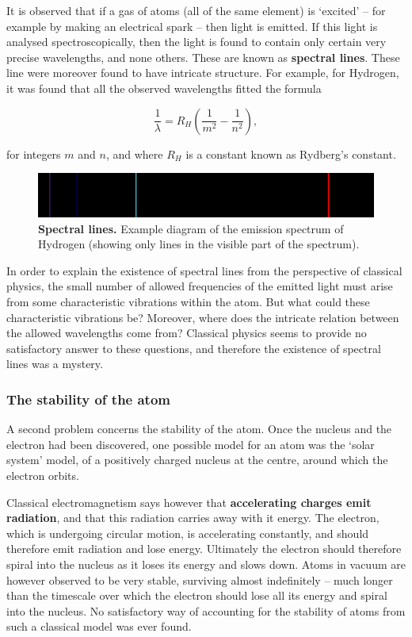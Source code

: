 \documentclass[9pt,Preprint]{lapreprint}
\begin{document}
It is observed that if a gas of atoms (all of the same element) is `excited' -- for example by making an electrical spark -- then light is emitted. If this light is analysed spectroscopically, then the light is found to contain only certain very precise wavelengths, and none others. These are known as \textbf{spectral lines}. These line were moreover found to have intricate structure. For example, for Hydrogen, it was found that all the observed wavelengths fitted the formula

\begin{equation}
\frac{1}{\lambda} = R_H \left(\frac{1}{m^2} - \frac{1}{n^2}\right),
\end{equation}

for integers $m$ and $n$, and where $R_H$ is a constant known as Rydberg's constant.

\begin{figure}[!htbp]
\centering
\includegraphics[width=0.7\linewidth]{files/Emission_spectrum-H-8dd91f1ad41c5b64ffa898637d5626f0.svg}
\caption[]{\textbf{Spectral lines.} Example diagram of the emission spectrum of Hydrogen (showing only lines in the visible part of the spectrum).}
\label{spectrum}
\end{figure}

In order to explain the existence of spectral lines from the perspective of classical physics, the small number of allowed frequencies of the emitted light must arise from some characteristic vibrations within the atom. But what could these characteristic vibrations be? Moreover, where does the intricate relation between the allowed wavelengths come from? Classical physics seems to provide no satisfactory answer to these questions, and therefore the existence of spectral lines was a mystery.

\subsubsection{The stability of the atom}\label{The stability of the atom}

A second problem concerns the stability of the atom. Once the nucleus and the electron had been discovered, one possible model for an atom was the `solar system' model, of a positively charged nucleus at the centre, around which the electron orbits.

Classical electromagnetism says however that \textbf{accelerating charges emit radiation}, and that this radiation carries away with it energy. The electron, which is undergoing circular motion, is accelerating constantly, and should therefore emit radiation and lose energy. Ultimately the electron should therefore spiral into the nucleus as it loses its energy and slows down.  Atoms in vacuum are however observed to be very stable, surviving almost indefinitely -- much longer than the timescale over which the electron should lose all its energy and spiral into the nucleus. No satisfactory way of accounting for the stability of atoms from such a classical model was ever found.
\end{document}
